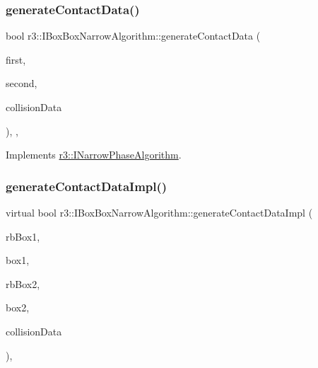 \subsubsection{\texorpdfstring{generate\+Contact\+Data()}{generateContactData()}}
{\footnotesize\ttfamily bool r3\+::\+I\+Box\+Box\+Narrow\+Algorithm\+::generate\+Contact\+Data (\begin{DoxyParamCaption}\item[{\mbox{\hyperlink{classr3_1_1_rigid_body}{Rigid\+Body}} $\ast$}]{first,  }\item[{\mbox{\hyperlink{classr3_1_1_rigid_body}{Rigid\+Body}} $\ast$}]{second,  }\item[{\mbox{\hyperlink{classr3_1_1_collision_data}{Collision\+Data}} \&}]{collision\+Data }\end{DoxyParamCaption})\hspace{0.3cm}{\ttfamily [final]}, {\ttfamily [override]}, {\ttfamily [virtual]}}



Implements \mbox{\hyperlink{classr3_1_1_i_narrow_phase_algorithm_a606fe8de5fe81ff45fedb81ca74717c3}{r3\+::\+I\+Narrow\+Phase\+Algorithm}}.

\mbox{\label{classr3_1_1_i_box_box_narrow_algorithm_abc15898100b5ed0537e4c6ccc6610069}} 
\subsubsection{\texorpdfstring{generate\+Contact\+Data\+Impl()}{generateContactDataImpl()}}
{\footnotesize\ttfamily virtual bool r3\+::\+I\+Box\+Box\+Narrow\+Algorithm\+::generate\+Contact\+Data\+Impl (\begin{DoxyParamCaption}\item[{\mbox{\hyperlink{classr3_1_1_rigid_body}{Rigid\+Body}} $\ast$}]{rb\+Box1,  }\item[{\mbox{\hyperlink{classr3_1_1_collision_box}{Collision\+Box}} $\ast$}]{box1,  }\item[{\mbox{\hyperlink{classr3_1_1_rigid_body}{Rigid\+Body}} $\ast$}]{rb\+Box2,  }\item[{\mbox{\hyperlink{classr3_1_1_collision_box}{Collision\+Box}} $\ast$}]{box2,  }\item[{\mbox{\hyperlink{classr3_1_1_collision_data}{Collision\+Data}} \&}]{collision\+Data }\end{DoxyParamCaption})\hspace{0.3cm}{\ttfamily [protected]}, {}}



